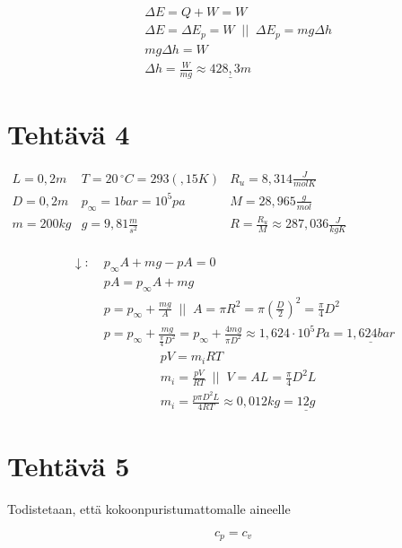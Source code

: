 \documentclass[12pt,a4paper,finnish]{article}
\begin{document}
\begin{align}
 &\Delta E = Q + W = W\\
 &\Delta E = \Delta E_p = W \;\;\bigg|\bigg|\;\; \Delta E_p = mg\Delta h\\
 &mg\Delta h = W\\
 &\Delta h = \frac{W}{mg} \approx \underline{428,3 m}
\end{align}

\section{Tehtävä 4}

\begin{math}
 \begin{array}{lll}
  L = 0,2m & T = 20\,^{\circ}C = 293(,15K )
    & R_u = 8,314\frac{J}{molK}\\
  D = 0,2m&p_\infty = 1 bar = 10^5 pa & M = 28,965\frac{g}{mol}\\
  m = 200kg  & g = 9,81 \frac{m}{s^2}& R = \frac{R_u}{M} \approx 287,036 \frac{J}{kgK}\\
 \end{array}
\end{math}

\begin{align}
 \downarrow: \; &p_\infty A + mg - pA = 0\\
 &pA = p_\infty A + mg\\
 &p = p_\infty + \frac{mg}{A} \;\;\bigg|\bigg|\;\; A = \pi R^2 = \pi \left(\frac{D}{2}\right)^2 = \frac{\pi}{4}D^2\\
 &p = p_\infty + \frac{mg}{\frac{\pi}{4}D^2} = p_\infty + \frac{4mg}{\pi D^2} 
  \approx 1,624\cdot10^5Pa = \underline{1,624 bar}
\end{align}
\begin{align}
 &pV = m_iRT\\
 &m_i = \frac{pV}{RT} \;\;\bigg|\bigg|\;\; V = AL = \frac{\pi}{4}D^2L\\
 &m_i = \frac{p\pi D^2L}{4RT} \approx 0,012kg = \underline{12g}
\end{align}

\section{Tehtävä 5} \label{t:5}

Todistetaan, että kokoonpuristumattomalle aineelle

\begin{framed}
 \begin{equation}
  c_p = c_v
 \end{equation}
\end{framed}
\end{document}

